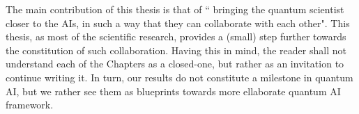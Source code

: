 The main contribution of this thesis is that of `` bringing the quantum scientist closer to the AIs, in such a way that they can collaborate with each other". This thesis, as most of the scientific research, provides a (small) step further towards the constitution of such collaboration. Having this in mind, the reader shall not understand each of the Chapters as a closed-one, but rather as an invitation to continue writing it. In turn, our results do not constitute a milestone in quantum AI, but we rather see them as blueprints towards more ellaborate quantum AI framework.
